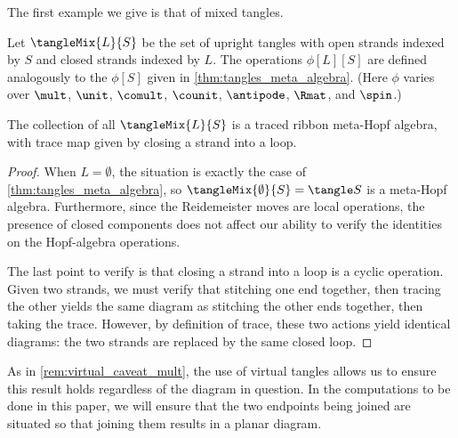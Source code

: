 
The first example we give is that of mixed tangles.

\begin{definition}
        Let $\tangleMix{L}{S}$ be the set of upright tangles with open
        strands indexed by $S$ and closed strands indexed by $L$. The operations
        $ϕ[L][S]$ are defined analogously to the $ϕ[S]$ given in
        \cref{thm:tangles_meta_algebra}. (Here $ϕ$ varies over $\mult$, $\unit$,
        $\comult$, $\counit$, $\antipode$, $\Rmat$, and $\spin$.)
\end{definition}

\begin{lemma}
        The collection of all $\tangleMix{L}{S}$ is a traced ribbon meta-Hopf
        algebra, with trace map given by closing a strand into a loop.
\end{lemma}
\begin{proof}
        When $L = \emptyset$, the situation is exactly the case of
        \cref{thm:tangles_meta_algebra}, so
        $\tangleMix{\emptyset}{S} = \tangle S$ is a
        meta-Hopf algebra. Furthermore, since the Reidemeister moves are local
        operations, the presence of closed components does not affect our
        ability to verify the identities on the Hopf-algebra operations.

        The last point to verify is that closing a strand into a loop is a
        cyclic operation. Given two strands, we must verify that stitching one
        end together, then tracing the other yields the same diagram as
        stitching the other ends together, then taking the trace. However, by
        definition of trace, these two actions yield identical diagrams: the two
        strands are replaced by the same closed loop.
\end{proof}

\begin{remark}
        As in \cref{rem:virtual_caveat_mult}, the use of virtual tangles allows
        us to ensure this result holds regardless of the diagram in question. In
        the computations to be done in this paper, we will ensure that the two
        endpoints being joined are situated so that joining them results in a
        planar diagram.
\end{remark}

